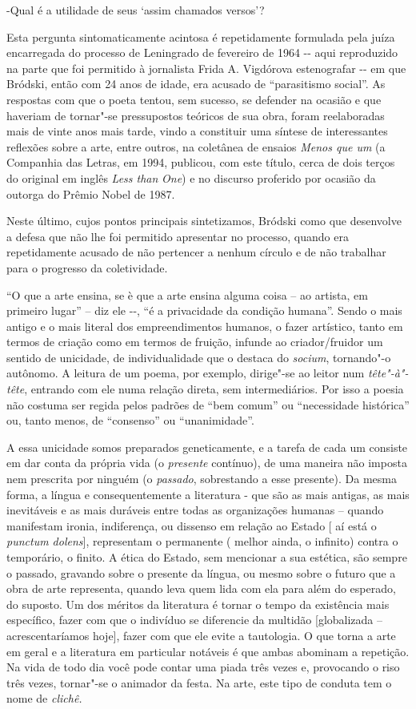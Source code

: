 -Qual é a utilidade de seus `assim chamados versos'?

Esta pergunta sintomaticamente acintosa é repetidamente formulada pela
juíza encarregada do processo de Leningrado de fevereiro de 1964 -\/-
aqui reproduzido na parte que foi permitido à jornalista Frida A.
Vigdórova estenografar -\/- em que Bródski, então com 24 anos de idade,
era acusado de ``parasitismo social''. As respostas com que o poeta
tentou, sem sucesso, se defender na ocasião e que haveriam de tornar"-se
pressupostos teóricos de sua obra, foram reelaboradas mais de vinte anos
mais tarde, vindo a constituir uma síntese de interessantes reflexões
sobre a arte, entre outros, na coletânea de ensaios \emph{Menos que um}
(a Companhia das Letras, em 1994, publicou, com este título, cerca de
dois terços do original em inglês \emph{Less than} \emph{One}) e no
discurso proferido por ocasião da outorga do Prêmio Nobel de 1987.

Neste último, cujos pontos principais sintetizamos, Bródski como que
desenvolve a defesa que não lhe foi permitido apresentar no processo,
quando era repetidamente acusado de não pertencer a nenhum círculo e de
não trabalhar para o progresso da coletividade.

``O que a arte ensina, se è que a arte ensina alguma coisa -- ao
artista, em primeiro lugar'' -- diz ele -\/-, ``é a privacidade da
condição humana''. Sendo o mais antigo e o mais literal dos
empreendimentos humanos, o fazer artístico, tanto em termos de criação
como em termos de fruição, infunde ao criador/fruidor um sentido de
unicidade, de individualidade que o destaca do \emph{socium}, tornando"-o
autônomo. A leitura de um poema, por exemplo, dirige"-se ao leitor num
\emph{tête"-à"-tête}, entrando com ele numa relação direta, sem
intermediários. Por isso a poesia não costuma ser regida pelos padrões
de ``bem comum'' ou ``necessidade histórica'' ou, tanto menos, de
``consenso'' ou ``unanimidade''.

A essa unicidade somos preparados geneticamente, e a tarefa de cada um
consiste em dar conta da própria vida (o \emph{presente} contínuo), de
uma maneira não imposta nem prescrita por ninguém (o \emph{passado},
sobrestando a esse presente). Da mesma forma, a língua e
consequentemente a literatura - que são as mais antigas, as mais
inevitáveis e as mais duráveis entre todas as organizações humanas --
quando manifestam ironia, indiferença, ou dissenso em relação ao Estado
{[} aí está o \emph{punctum dolens}{]}, representam o permanente (
melhor ainda, o infinito) contra o temporário, o finito. A ética do
Estado, sem mencionar a sua estética, são sempre o passado, gravando
sobre o presente da língua, ou mesmo sobre o futuro que a obra de arte
representa, quando leva quem lida com ela para além do esperado, do
suposto. Um dos méritos da literatura é tornar o tempo da existência
mais específico, fazer com que o indivíduo se diferencie da multidão
{[}globalizada -- acrescentaríamos hoje{]}, fazer com que ele evite a
tautologia. O que torna a arte em geral e a literatura em particular
notáveis é que ambas abominam a repetição. Na vida de todo dia você pode
contar uma piada três vezes e, provocando o riso três vezes, tornar"-se o
animador da festa. Na arte, este tipo de conduta tem o nome de
\emph{clichê.}

